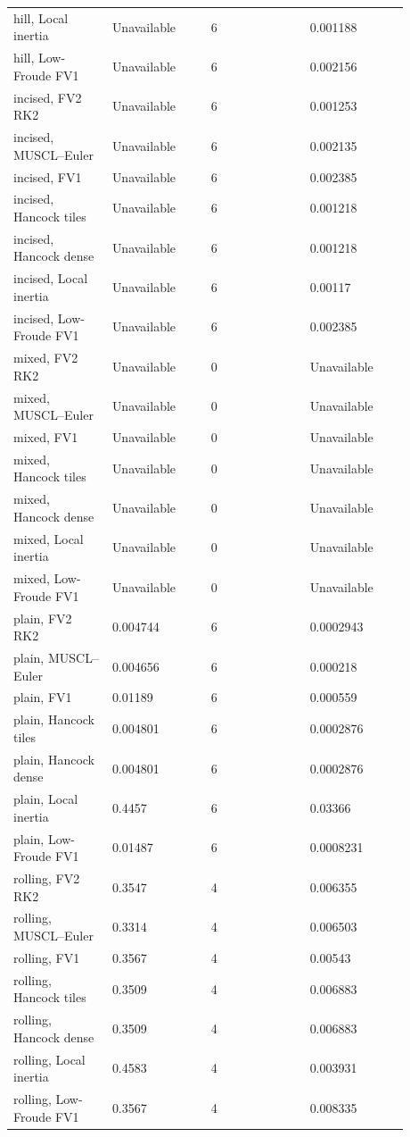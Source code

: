 \begin{longtable}{p{0.2200\linewidth}p{0.2200\linewidth}p{0.2200\linewidth}p{0.2200\linewidth}}
hill, Local inertia & Unavailable & 6 & 0.001188 \\
hill, Low-Froude FV1 & Unavailable & 6 & 0.002156 \\
incised, FV2 RK2 & Unavailable & 6 & 0.001253 \\
incised, MUSCL–Euler & Unavailable & 6 & 0.002135 \\
incised, FV1 & Unavailable & 6 & 0.002385 \\
incised, Hancock tiles & Unavailable & 6 & 0.001218 \\
incised, Hancock dense & Unavailable & 6 & 0.001218 \\
incised, Local inertia & Unavailable & 6 & 0.00117 \\
incised, Low-Froude FV1 & Unavailable & 6 & 0.002385 \\
mixed, FV2 RK2 & Unavailable & 0 & Unavailable \\
mixed, MUSCL–Euler & Unavailable & 0 & Unavailable \\
mixed, FV1 & Unavailable & 0 & Unavailable \\
mixed, Hancock tiles & Unavailable & 0 & Unavailable \\
mixed, Hancock dense & Unavailable & 0 & Unavailable \\
mixed, Local inertia & Unavailable & 0 & Unavailable \\
mixed, Low-Froude FV1 & Unavailable & 0 & Unavailable \\
plain, FV2 RK2 & 0.004744 & 6 & 0.0002943 \\
plain, MUSCL–Euler & 0.004656 & 6 & 0.000218 \\
plain, FV1 & 0.01189 & 6 & 0.000559 \\
plain, Hancock tiles & 0.004801 & 6 & 0.0002876 \\
plain, Hancock dense & 0.004801 & 6 & 0.0002876 \\
plain, Local inertia & 0.4457 & 6 & 0.03366 \\
plain, Low-Froude FV1 & 0.01487 & 6 & 0.0008231 \\
rolling, FV2 RK2 & 0.3547 & 4 & 0.006355 \\
rolling, MUSCL–Euler & 0.3314 & 4 & 0.006503 \\
rolling, FV1 & 0.3567 & 4 & 0.00543 \\
rolling, Hancock tiles & 0.3509 & 4 & 0.006883 \\
rolling, Hancock dense & 0.3509 & 4 & 0.006883 \\
rolling, Local inertia & 0.4583 & 4 & 0.003931 \\
rolling, Low-Froude FV1 & 0.3567 & 4 & 0.008335 \\
\end{longtable}
\endgroup
